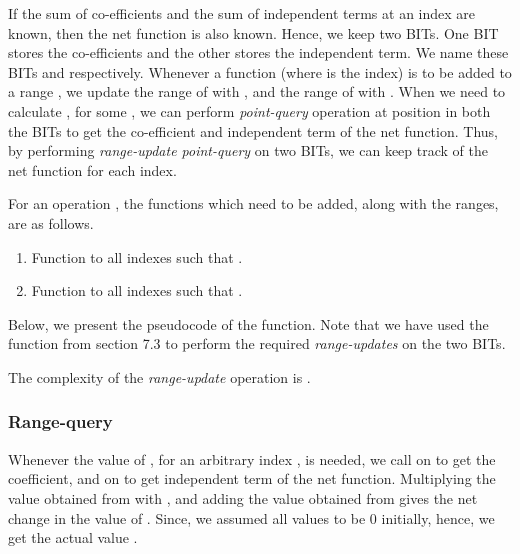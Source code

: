 \documentclass[a4paper]{article}
\begin{document}
\vspace{2 mm}
If the sum of co-efficients and the sum of independent terms at an index are known, then the net function is also known. Hence, we keep two BITs. One BIT stores the co-efficients and the other stores the independent term. We name these BITs  and  respectively. Whenever a function  (where  is the index) is to be added to a range , we update the range  of  with , and the range  of  with . When we need to calculate , for some , we can perform \textit{point-query} operation at position  in both the BITs to get the co-efficient and independent term of the net function.
Thus, by performing \textit{range-update point-query} on two BITs, we can keep track of the net function for each index.

\vspace{2 mm}
For an operation , the functions which need to be added, along with the ranges, are as follows.

\begin{enumerate}
\item Function  to all indexes  such that .
\item Function  to all indexes  such that .
\end{enumerate}

Below, we present the pseudocode of the  function. Note that we have used the  function from section 7.3 to perform the required \textit{range-updates} on the two BITs.

\vspace {3 mm}
\noindent
{}
\begin{algorithmic}[1]

        \State 
        \State 
        \State 
\EndFunction
\end{algorithmic}

\vspace{3 mm}
The complexity of the \textit{range-update} operation is .

\subsubsection{Range-query}
Whenever the value of , for an arbitrary index , is needed, we call  on  to get the coefficient, and on  to get independent term of the net function. Multiplying the value obtained from  with , and adding the value obtained from  gives the net change in the value of . Since, we assumed all values to be 0 initially, hence, we get the actual value .
\end{document}
